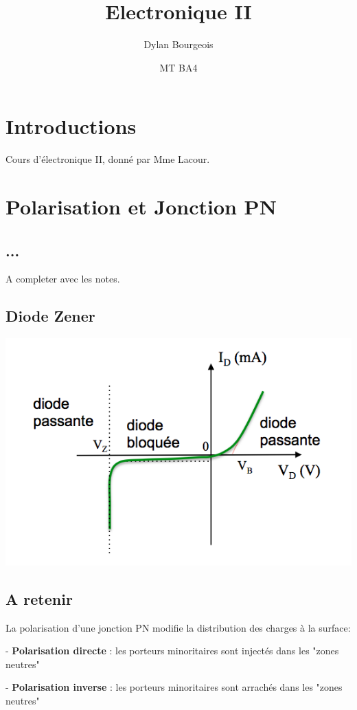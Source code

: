 \documentclass[]{article}
\begin{document}
\title{Electronique II}
\author{Dylan Bourgeois}
\date{MT BA4}
\maketitle

\section{Introductions}
Cours d'électronique II, donné par Mme Lacour.
\section{Polarisation et Jonction PN}
\subsection{...}
A completer avec les notes.

\subsection{Diode Zener}
\includegraphics[scale=0.8]{zener_IV.png} 
\subsection{A retenir}

La polarisation d'une jonction PN modifie la distribution des charges à la surface:

-  \textbf{Polarisation directe} : les porteurs minoritaires sont injectés dans les "zones neutres"

- \textbf{Polarisation inverse} : les porteurs minoritaires sont arrachés dans les "zones neutres"
\end{document}
